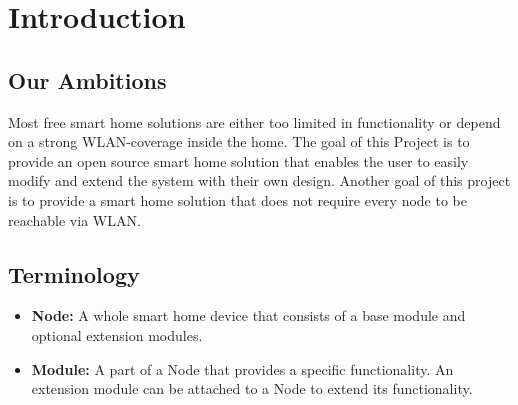 \chapter{Introduction}
\renewcommand*\chapterpagestyle{scrheadings}

    \section{Our Ambitions}
        Most free smart home solutions are either too limited in
        functionality or depend on a strong WLAN-coverage inside the
        home.
        The goal of this Project is to provide an open source
        smart home solution that enables the user to easily modify 
        and extend the system with their own design. Another goal of
        this project is to provide a smart home solution that does
        not require every node to be reachable via WLAN.

    \section{Terminology}
        \begin{itemize}
            \item \textbf{Node:} A whole smart home device that
            consists of a base module and optional extension modules.

            \item \textbf{Module:} A part of a Node that provides
            a specific functionality. An extension module can be
            attached to a Node to extend its functionality.

        \end{itemize}


    